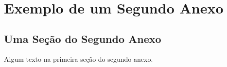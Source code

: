 \chapter{Exemplo de um Segundo Anexo}


\section{Uma Seção do Segundo Anexo}
Algum texto na primeira seção do segundo anexo.

